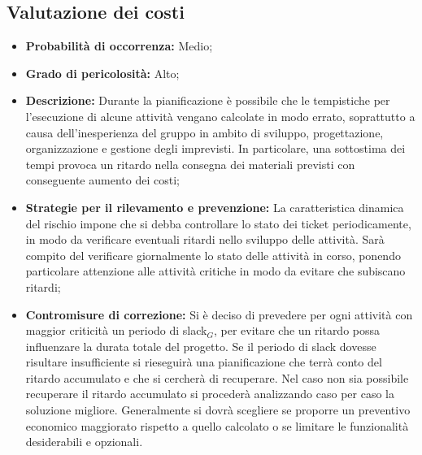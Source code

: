 \subsection{Valutazione dei costi}
\begin{itemize}
\item \textbf{Probabilità di occorrenza:} Medio;
\item \textbf{Grado di pericolosità:} Alto;
\item \textbf{Descrizione:} Durante la pianificazione è possibile che le tempistiche per l'esecuzione di alcune attività vengano calcolate in modo errato, soprattutto a causa dell'inesperienza del gruppo in ambito di sviluppo, progettazione, organizzazione e gestione degli imprevisti. In particolare, una sottostima dei tempi provoca un ritardo nella consegna dei materiali previsti con conseguente aumento dei costi;

\item \textbf{Strategie per il rilevamento e prevenzione:} La caratteristica dinamica del rischio impone che si debba controllare lo stato dei ticket periodicamente, in modo da verificare eventuali ritardi nello sviluppo delle attività. Sarà compito del \ruoloResponsabile verificare giornalmente lo stato delle attività in corso, ponendo particolare attenzione alle attività critiche in modo da evitare che subiscano ritardi;


\item \textbf{Contromisure di correzione:} Si è deciso di prevedere per ogni attività con maggior criticità un periodo di slack$_G$, per evitare che un ritardo possa influenzare la durata totale del progetto. Se il periodo di slack dovesse risultare insufficiente si rieseguirà una pianificazione che terrà conto del ritardo accumulato e che si cercherà di recuperare. Nel caso non sia possibile recuperare il ritardo accumulato si procederà analizzando caso per caso la soluzione migliore. Generalmente si dovrà scegliere se proporre un preventivo economico maggiorato rispetto a quello calcolato o se limitare le funzionalità desiderabili e opzionali.

\end{itemize}

